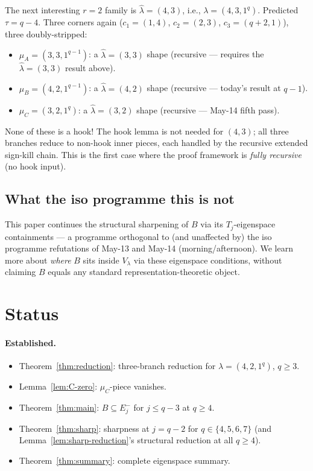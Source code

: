 \documentclass[11pt]{article}
\theoremstyle{definition}
\newcommand{\hatl}{\widehat\lambda}
\begin{document}
The next interesting $r = 2$ family is $\hatl = (4, 3)$, i.e.,
$\lambda = (4, 3, 1^q)$.  Predicted $\tau = q - 4$.  Three corners
again ($c_1 = (1, 4)$, $c_2 = (2, 3)$, $c_3 = (q+2, 1)$), three
doubly-stripped:
\begin{itemize}[topsep=0.3em,itemsep=0.1em]
\item $\mu_A = (3, 3, 1^{q-1})$: a $\hatl = (3, 3)$ shape
   (recursive — requires the $\hatl = (3, 3)$ result above).
\item $\mu_B = (4, 2, 1^{q-1})$: a $\hatl = (4, 2)$ shape
   (recursive — today's result at $q - 1$).
\item $\mu_C = (3, 2, 1^q)$: a $\hatl = (3, 2)$ shape (recursive
   — May-14 fifth pass).
\end{itemize}
None of these is a hook!  The hook lemma is not needed for $(4, 3)$;
all three branches reduce to non-hook inner pieces, each handled by
the recursive extended sign-kill chain.  This is the first case
where the proof framework is \emph{fully recursive} (no hook input).

\subsection{What the iso programme this is not}

This paper continues the structural sharpening of $B$ via its
$T_j$-eigenspace containments — a programme orthogonal to (and
unaffected by) the iso programme refutations of May-13 and
May-14 (morning/afternoon).  We learn more about \emph{where} $B$
sits inside $V_\lambda$ via these eigenspace conditions, without
claiming $B$ equals any standard representation-theoretic object.

\section{Status}\label{sec:status}

\paragraph{Established.}
\begin{itemize}[topsep=0.3em,itemsep=0.1em]
\item Theorem~\ref{thm:reduction}: three-branch reduction for
   $\lambda = (4, 2, 1^q)$, $q \ge 3$.
\item Lemma~\ref{lem:C-zero}: $\mu_C$-piece vanishes.
\item Theorem~\ref{thm:main}: $B \subseteq E_j^-$ for $j \le q - 3$
   at $q \ge 4$.
\item Theorem~\ref{thm:sharp}: sharpness at $j = q - 2$ for
   $q \in \{4, 5, 6, 7\}$ (and Lemma~\ref{lem:sharp-reduction}'s
   structural reduction at all $q \ge 4$).
\item Theorem~\ref{thm:summary}: complete eigenspace summary.
\end{itemize}
\end{document}
